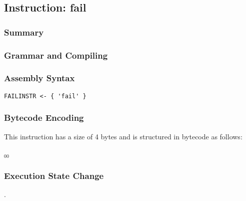 \subsection{Instruction: fail}

\subsubsection{Summary}


\subsubsection{Grammar and Compiling}


\subsubsection{Assembly Syntax}

\begin{myquote}
\begin{verbatim}
FAILINSTR <- { 'fail' }
\end{verbatim}
\end{myquote}

\subsubsection{Bytecode Encoding}

This instruction has a size of 4 bytes and is structured in bytecode as follows:

$_{00}$\ 


\subsubsection{Execution State Change}

.


